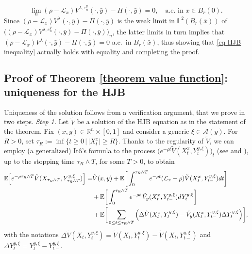 \documentclass[11pt]{amsart}
\theoremstyle{plain}
\def \dd{{\rm d}}
\numberwithin{equation}{section}
\begin{document}
$$
\lim_n (\rho -\mathcal{L}_{x}) {V}^{\lambda,\varepsilon^{\bar y}_n} (\cdot,\bar y)-\Pi(\cdot,\bar y) = 0, \quad \text{a.e.\ in $x \in B_r(0)$.}
$$
Since $(\rho -\mathcal{L}_{x}) {V^\lambda} (\cdot,\bar y)-\Pi(\cdot,\bar y)  $ is the weak limit in $\mathbb L ^2 (B_r(\bar x))$ of $\big( (\rho -\mathcal{L}_{x}) {V}^{\lambda,\varepsilon^{\bar y}_n} (\cdot,\bar y)-\Pi(\cdot,\bar y) \big)_n$, the latter limits in turn implies that $(\rho -\mathcal{L}_{x}) {V^\lambda} (\cdot,\bar y)-\Pi(\cdot,\bar y) =0 $ a.e.\ in $ B_r(\bar x)$, thus showing that \eqref{eq HJB inequality} actually holds with equality and completing the proof.


\subsection{Proof of Theorem \ref{theorem value function}: uniqueness for the HJB}\label{subsection uniqueness HJB}
Uniqueness of the solution follows from a verification argument, that we prove in two steps.
\smallbreak\noindent
\emph{Step 1.}
Let $\tilde V$ be a solution of the HJB equation as in the statement of the theorem.
Fix $(x,y) \in \mathbb R ^n \times [0,1]$ and consider a generic $\xi \in \mathcal A (y)$.
For $R>0$, set $\tau_R:=\inf\{t \ge 0 \,| \,  |X^x_t| \ge R\}$. 
Thanks to the regularity of $\tilde V$, we can employ (a generalized) It\^o's formula to the process $\big( e^{-\rho t} \tilde V (X^x_t, Y^{y,\xi}_t) \big)_t$ (see \cite[Chapter 8, Section VIII.4, Theorem 4.1]{fleming2006controlled} and \cite[Theorem 4.2]{angelis2019solvable}),  up to the
stopping time $\tau_R \wedge T$, for some $T > 0$, to obtain
\begin{equation}\label{eq Ito verification}
\begin{aligned}
  \mathbb{E}\Big[e^{-\rho \tau_R \wedge T } \tilde V(X_{\tau_R\wedge T},Y^{y,\xi}_{\tau_R\wedge T})\Big] 
  =& \tilde V (x,y) 
     +\mathbb{E}\bigg[\int_0^{\tau_R\wedge T} e^{-\rho t} (\mathcal{L}_x - \rho) \tilde V (X^x_t,Y^{y,\xi}_{t-})    \dd t \bigg] \\ 
    & + \mathbb{E}\bigg[\int_0^{\tau_R\wedge T} e^{-\rho t} \, \tilde V _y (X^x_t,Y^{y,\xi}_{t-}) \dd Y_t^{y,\xi} \bigg]\\
    &+\mathbb{E}\bigg[\sum_{0\leq t\leq \tau_R\wedge T} \Big( \Delta \tilde V  (X^x_t,Y^{y,\xi}_{t}) - \tilde V _y (X^x_t,Y^{y,\xi}_{t-})\Delta Y^{y,\xi}_t \Big)\bigg], 
\end{aligned}
\end{equation}
with the notations $\Delta \tilde V(X_t,Y^{y,\xi}_{t}) =\tilde V(X_t,Y^{y,\xi}_{t})-\tilde V(X_t,Y^{y,\xi}_{t-})$ and $\Delta Y^{y,\xi}_t =Y^{y,\xi}_t - Y^{y,\xi}_{t-} $.
\end{document}
